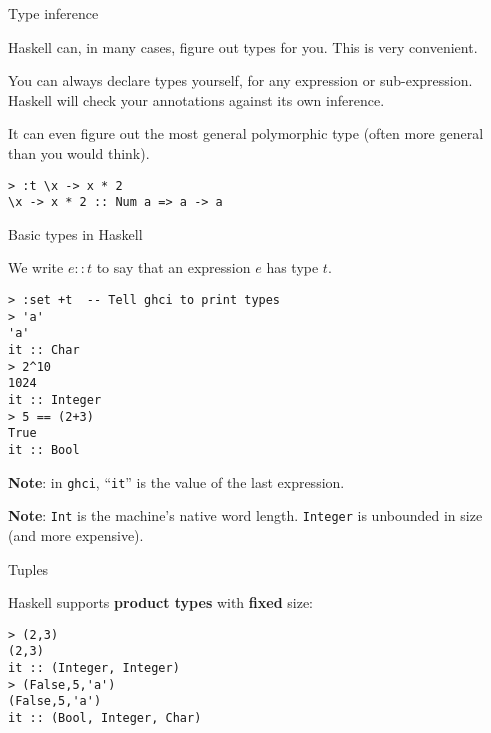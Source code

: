 %
\begin{frame}[fragile]{Type inference}

Haskell can, in many cases, figure out types for you. This is very convenient.

You can always declare types yourself, for any expression or sub-expression.
Haskell will check your annotations against its own inference.

It can even figure out the most general polymorphic type (often more general
than you would think).

\begin{block}{}
\begin{verbatim}
> :t \x -> x * 2
\x -> x * 2 :: Num a => a -> a
\end{verbatim}
\end{block}

\end{frame}

%
\begin{frame}[fragile]{Basic types in Haskell}

We write $e::t$ to say that an expression $e$ has type $t$.

\begin{block}{}
\begin{verbatim}
> :set +t  -- Tell ghci to print types
> 'a'
'a'
it :: Char
> 2^10
1024
it :: Integer
> 5 == (2+3)
True
it :: Bool
\end{verbatim}
\end{block}

\textbf{Note}: in \texttt{ghci}, ``\texttt{it}'' is the value of the last
expression.

\textbf{Note}: \texttt{Int} is the machine's native word length.
\texttt{Integer} is unbounded in size (and more expensive).

\end{frame}

%
\begin{frame}[fragile]{Tuples}

Haskell supports \textbf{product types} with \textbf{fixed} size:

\begin{block}{}
\begin{verbatim}
> (2,3)
(2,3)
it :: (Integer, Integer)
> (False,5,'a')
(False,5,'a')
it :: (Bool, Integer, Char)
\end{verbatim}
\end{block}

\end{frame}

